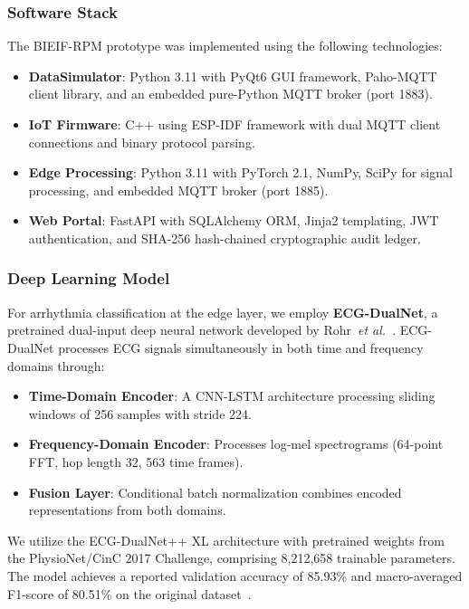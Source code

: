 \subsubsection{Software Stack}

The BIEIF-RPM prototype was implemented using the following technologies:
\begin{itemize}
    \item \textbf{DataSimulator}: Python 3.11 with PyQt6 GUI framework, Paho-MQTT client library, and an embedded pure-Python MQTT broker (port 1883).
    \item \textbf{IoT Firmware}: C++ using ESP-IDF framework with dual MQTT client connections and binary protocol parsing.
    \item \textbf{Edge Processing}: Python 3.11 with PyTorch 2.1, NumPy, SciPy for signal processing, and embedded MQTT broker (port 1885).
    \item \textbf{Web Portal}: FastAPI with SQLAlchemy ORM, Jinja2 templating, JWT authentication, and SHA-256 hash-chained cryptographic audit ledger.
\end{itemize}

\subsubsection{Deep Learning Model}

For arrhythmia classification at the edge layer, we employ \textbf{ECG-DualNet}, a pretrained dual-input deep neural network developed by Rohr~\textit{et al.}~\cite{rohr2022ecgdualnet}. ECG-DualNet processes ECG signals simultaneously in both time and frequency domains through:
\begin{itemize}
    \item \textbf{Time-Domain Encoder}: A CNN-LSTM architecture processing sliding windows of 256 samples with stride 224.
    \item \textbf{Frequency-Domain Encoder}: Processes log-mel spectrograms (64-point FFT, hop length 32, 563 time frames).
    \item \textbf{Fusion Layer}: Conditional batch normalization combines encoded representations from both domains.
\end{itemize}

We utilize the ECG-DualNet++ XL architecture with pretrained weights from the PhysioNet/CinC 2017 Challenge, comprising 8,212,658 trainable parameters. The model achieves a reported validation accuracy of 85.93\% and macro-averaged F1-score of 80.51\% on the original dataset~\cite{rohr2022ecgdualnet}.

